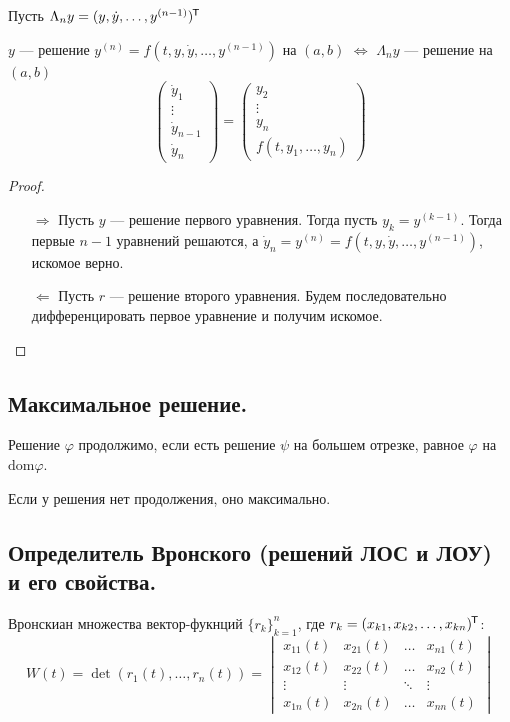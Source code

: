 Пусть \(\Lambda_n y = (y, \dot{y}, \dots , y^{(n - 1)})^{\mkern-1.5mu\mathsf{T}} \)

\begin{lemma}
    \(y\) --- решение \(y^{(n)} = f(t, y, \dot{y}, \dots , y^{(n - 1)})\) на \((a, b)\) \(\Leftrightarrow\) \(\Lambda_n y\) --- решение на \((a, b)\) \[\begin{pmatrix} \dot{y}_1 \\ \vdots \\ \dot{y}_{n - 1} \\ \dot{y}_{n} \end{pmatrix} = \begin{pmatrix} y_2 \\ \vdots \\ y_n \\ f(t, y_1, \dots , y_n) \end{pmatrix} \]
\end{lemma}
\begin{proof}\itemfix
    \begin{itemize}
        \item [\( \Rightarrow \)] Пусть \(y\) --- решение первого уравнения. Тогда пусть \(y_k = y^{(k - 1)}\). Тогда первые \(n - 1\) уравнений решаются, а \(\dot{y}_n = y^{(n)} = f(t, y, \dot{y}, \dots , y^{(n - 1)})\), искомое верно.
        \item [\( \Leftarrow \)] Пусть \(r\) --- решение второго уравнения. Будем последовательно дифференцировать первое уравнение и получим искомое.
    \end{itemize}
\end{proof}

\subsection*{Максимальное решение.}

Решение \(\varphi\) продолжимо, если есть решение \(\psi\) на большем отрезке, равное \(\varphi\) на \(\text{dom} \varphi\).

Если у решения нет продолжения, оно максимально.

\subsection*{Определитель Вронского (решений ЛОС и ЛОУ) и его свойства.}

Вронскиан множества вектор-фукнций \(\{r_k\}_{k = 1}^n\), где \(r_k = (x_{k1}, x_{k2}, \dots, x_{kn})^{\mkern-1.5mu\mathsf{T}} \):
\[W(t) = \det (r_1(t), \dots , r_n(t)) = \begin{vmatrix} x_{11}(t) & x_{21}(t) & \dots & x_{n1}(t) \\ x_{12}(t) & x_{22}(t) & \dots & x_{n2}(t) \\ \vdots & \vdots & \ddots & \vdots \\ x_{1n}(t) & x_{2n}(t) & \dots & x_{nn}(t) \end{vmatrix} \]

